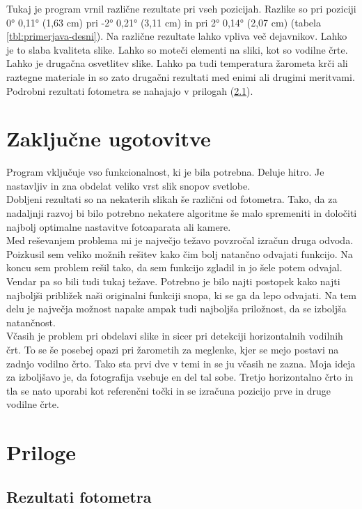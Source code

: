 \documentclass[oneside, a4paper, 12pt]{book}
\begin{document}
Tukaj je program vrnil različne rezultate pri vseh pozicijah. Razlike so pri poziciji 0° 0,11° (1,63 cm) pri -2° 0,21° (3,11 cm) in pri 2° 0,14° (2,07 cm) (tabela \ref{tbl:primerjava-desni}). Na različne rezultate lahko vpliva več dejavnikov. Lahko je to slaba kvaliteta slike. Lahko so moteči elementi na sliki, kot so vodilne črte. Lahko je drugačna osvetlitev slike. Lahko pa tudi temperatura žarometa krči ali raztegne materiale in so zato drugačni rezultati med enimi ali drugimi meritvami. Podrobni rezultati fotometra se nahajajo v prilogah (\ref{ch:rf}).

\chapter{Zaključne ugotovitve}
Program vključuje vso funkcionalnost, ki je bila potrebna. Deluje hitro. Je nastavljiv in zna obdelat veliko vrst slik snopov svetlobe.\\
Dobljeni rezultati so na nekaterih slikah še različni od fotometra. Tako, da za nadaljnji razvoj bi bilo potrebno nekatere algoritme še malo spremeniti in določiti najbolj optimalne nastavitve fotoaparata ali kamere.\\
Med reševanjem problema mi je največjo težavo povzročal izračun druga odvoda. Poizkusil sem veliko možnih rešitev kako čim bolj natančno odvajati funkcijo. Na koncu sem problem rešil tako, da sem funkcijo zgladil in jo šele potem odvajal. Vendar pa so bili tudi tukaj težave. Potrebno je bilo najti postopek kako najti najboljši približek naši originalni funkciji snopa, ki se ga da lepo odvajati. Na tem delu je največja možnost napake ampak tudi najboljša priložnost, da se izboljša natančnost.\\
Včasih je problem pri obdelavi slike in sicer pri detekciji horizontalnih vodilnih črt. To se še posebej opazi pri žarometih za meglenke, kjer se mejo postavi na zadnjo vodilno črto. Tako sta prvi dve v temi in se ju včasih ne zazna. Moja ideja za izboljšavo je, da fotografija vsebuje en del tal sobe. Tretjo horizontalno črto in tla se nato uporabi kot referenčni točki in se izračuna pozicijo prve in druge vodilne črte.

\chapter{Priloge}
\section{Rezultati fotometra}
\label{ch:rf}
\end{document}
